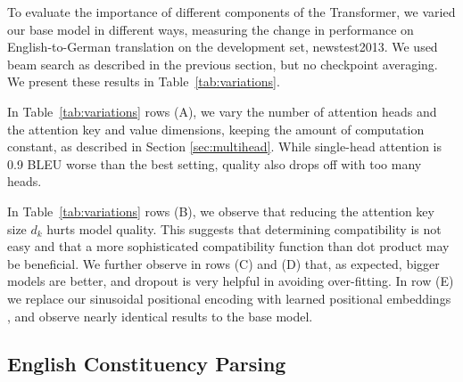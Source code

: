 \documentclass{article}
\begin{document}
To evaluate the importance of different components of the Transformer, we varied our base model in different ways, measuring the change in performance on English-to-German translation on the development set, newstest2013. We used beam search as described in the previous section, but no checkpoint averaging.  We present these results in Table~\ref{tab:variations}.  

In Table~\ref{tab:variations} rows (A), we vary the number of attention heads and the attention key and value dimensions, keeping the amount of computation constant, as described in Section \ref{sec:multihead}. While single-head attention is 0.9 BLEU worse than the best setting, quality also drops off with too many heads.

In Table~\ref{tab:variations} rows (B), we observe that reducing the attention key size $d_k$ hurts model quality. This suggests that determining compatibility is not easy and that a more sophisticated compatibility function than dot product may be beneficial. We further observe in rows (C) and (D) that, as expected, bigger models are better, and dropout is very helpful in avoiding over-fitting.  In row (E) we replace our sinusoidal positional encoding with learned positional embeddings \citep{JonasFaceNet2017}, and observe nearly identical results to the base model.






\subsection{English Constituency Parsing}
\end{document}

